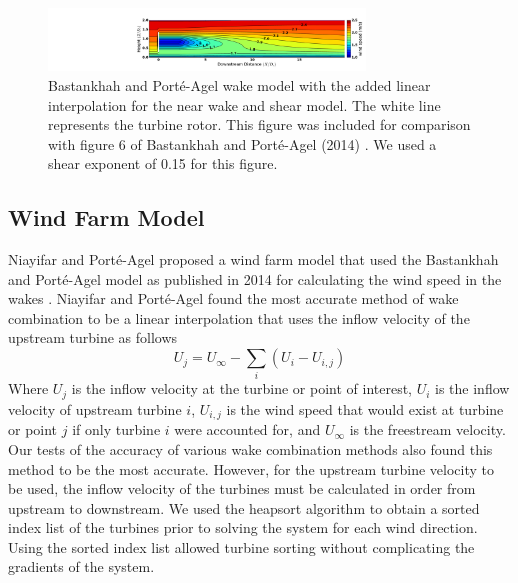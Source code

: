 \documentclass[conf]{new-aiaa}
\begin{document}
\begin{figure}[ht]
	\centering
	\includegraphics[width=0.75\textwidth, trim={18.5cm 1cm 4.cm 1cm}]{final_images/model_contours_vertical.pdf}
	\caption{Bastankhah and Port\'{e}-Agel wake model with the added linear interpolation for the near wake and shear model. The white line represents the turbine rotor. This figure was included for comparison with figure 6 of Bastankhah and Port\'{e}-Agel (2014) \cite{bastankhah2014}. We used a shear exponent of 0.15 for this figure.}
	\label{fig:model_contours}
\end{figure}


\subsection{Wind Farm Model}

Niayifar and Port\'{e}-Agel proposed a wind farm model that used the Bastankhah and Port\'{e}-Agel model as published in 2014 \cite{bastankhah2014} for calculating the wind speed in the wakes \cite{niayifar2015, niayifar2016}. 
Niayifar and Port\'{e}-Agel found the most accurate method of wake combination to be a linear interpolation that uses the inflow velocity of the upstream turbine as follows 
%
\begin{equation}
	U_j = U_\infty - \sum_i (U_i - U_{i,j})
\end{equation}
%
Where $U_j$ is the inflow velocity at the turbine or point of interest, $U_i$ is the inflow velocity of upstream turbine $i$, $U_{i,j}$ is the wind speed that would exist at turbine or point $j$ if only turbine $i$ were accounted for, and $U_{\infty}$ is the freestream velocity. Our tests of the accuracy of various wake combination methods also found this method to be the most accurate. However, for the upstream turbine velocity to be used, the inflow velocity of the turbines must be calculated in order from upstream to downstream. We used the heapsort algorithm to obtain a sorted index list of the turbines prior to solving the system for each wind direction. Using the sorted index list allowed turbine sorting without complicating the gradients of the system.
\end{document}
